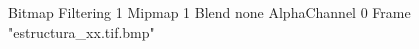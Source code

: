 {Bitmap
	{Filtering 1}
	{Mipmap 1}
	{Blend none}
	{AlphaChannel 0}
	{Frame "estructura_xx.tif.bmp"}
}
